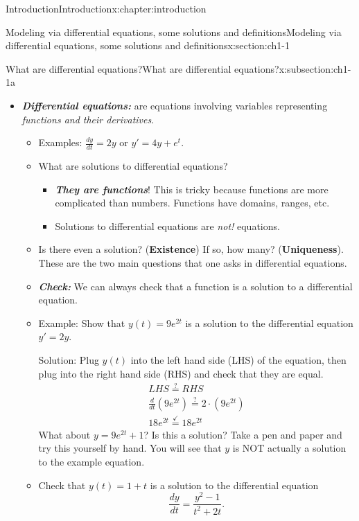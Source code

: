 \documentclass[oneside,10pt,]{book}
\newcommand{\alert}[1]{\textbf{\textit{#1}}}
\newcommand{\terminology}[1]{\textbf{#1}}
\numberwithin{equation}{section}
\numberwithin{equation}{section}
\begin{document}
\begin{chapterptx}{Introduction}{}{Introduction}{}{}{x:chapter:introduction}
\begin{sectionptx}{Modeling via differential equations, some solutions and definitions}{}{Modeling via differential equations, some solutions and definitions}{}{}{x:section:ch1-1}
\begin{subsectionptx}{What are differential equations?}{}{What are differential equations?}{}{}{x:subsection:ch1-1a}
\begin{itemize}[label=\textbullet]
\begin{itemize}[label=$\circ$]
\begin{itemize}[label=$\blacksquare$]
\item{}But notice that there is another solution, \(x = -1\) as well. So solutions are not \emph{unique} in this case.%
\end{itemize}
%
\end{itemize}
%
\item{}\alert{Differential equations:} are equations involving variables representing \emph{functions and their derivatives}.%
\begin{itemize}[label=$\circ$]
\item{}Examples: \(\frac{dy}{dt} = 2y\) or \(y' = 4y + e^t\).%
\item{}What are solutions to differential equations?%
\begin{itemize}[label=$\blacksquare$]
\item{}\alert{They are functions}! This is tricky because functions are more complicated than numbers. Functions have domains, ranges, etc.%
\item{}Solutions to differential equations are \emph{not!} equations.%
\end{itemize}
%
\item{}Is there even a solution? (\terminology{Existence}) If so, how many? (\terminology{Uniqueness}). These are the two main questions that one asks in differential equations.%
\item{}\alert{Check:} We can always check that a function is a solution to a differential equation.%
\item{}Example: Show that \(y(t) = 9e^{2t}\) is a solution to the differential equation \(y' = 2y\).%
\par
Solution: Plug \(y(t)\) into the left hand side (LHS) of the equation, then plug into the right hand side (RHS) and check that they are equal.%
%
\begin{gather*}
LHS \overset{?}= RHS\\
\frac{d}{dt}(9e^{2t}) \overset{?}= 2\cdot (9e^{2t})\\
18e^{2t} \overset{\checkmark}= 18e^{2t}
\end{gather*}
What about \(y = 9e^{2t}+1\)? Is this a solution? Take a pen and paper and try this yourself by hand. You will see that \(y\) is NOT actually a solution to the example equation.%
\item{}Check that \(y(t) = 1 + t\) is a solution to the differential equation%
\begin{equation*}
\frac{dy}{dt} = \frac{y^2 - 1}{t^2 + 2t}.
\end{equation*}
%
\par

\end{itemize}
\end{itemize}
\end{subsectionptx}
\end{sectionptx}
\end{chapterptx}
\end{document}

